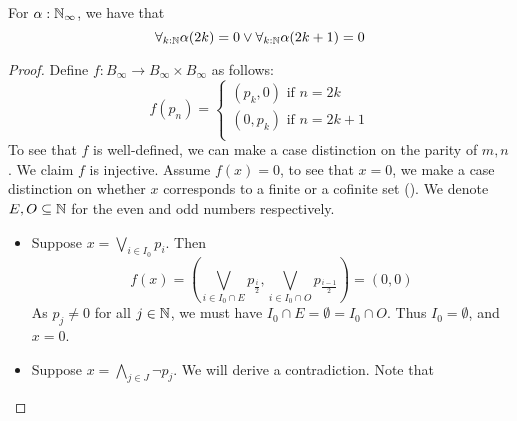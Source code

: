 \begin{theorem}\label{LLPO}
  For $\alpha:\mathbb{N}_\infty$, 
  we have that 
  \begin{equation}\label{eqnLLPO}
    \forall_{k:\mathbb{N}} \alpha(2k) = 0  \vee \forall_{k:\mathbb{N}} \alpha(2k+1) = 0
  \end{equation}
\end{theorem}
\begin{proof}
%
  Define $f:B_\infty \to B_\infty \times B_\infty$ as follows:
  \begin{equation}
    f(p_n) =\begin{cases}
      (p_k,0) \text{ if } n = 2k\\
      (0,p_k) \text{ if } n = 2k+1\\
    \end{cases}
  \end{equation}
  To see that $f$ is well-defined, we can make a case distinction on the parity of $m,n$. 
  We claim $f$ is injective. Assume $f(x) = 0$, 
  to see that $x=0$, we make a case distinction on whether $x$ corresponds to a finite or a cofinite set 
  ().
%
  We denote $E,O\subseteq \mathbb{N}$ for the even and odd numbers respectively. 
  \begin{itemize}
    \item Suppose 
      $x = \bigvee_{i\in I_0} p_i$. 
      Then 
      $$f(x) = (\bigvee_{i\in I_0 \cap E } p_{\frac i2} , \bigvee_{i\in I_0 \cap O } p_{\frac {i-1}2} ) = (0,0)$$
      As $p_j\neq 0$ for all $j\in\mathbb{N}$, we must have $I_0 \cap E = \emptyset = I_0 \cap O$. 
      Thus $I_0= \emptyset$, and $x = 0$. 
    \item Suppose 
      $x = \bigwedge_{j\in J} \neg p_j$. %
      We will derive a contradiction. %
      Note that   

\end{itemize}
\end{proof}

